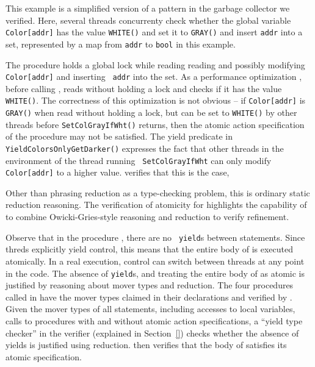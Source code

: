This example is a simplified version of a pattern in the garbage
collector we verified. Here, several threads concurrenty check 
whether the global variable {\tt Color[addr]} has the value {\tt WHITE()}
and set it to {\tt GRAY()} and insert {\tt addr} into a 
set, represented by a map from {\tt addr} to {\tt bool} in this
example. 

 
The procedure  
 holds a global lock while reading
reading and possibly modifying {\tt Color[addr]} and inserting {\tt
  addr} into the set. 
As a performance optimization , before calling
, reads  without holding a lock
and checks if it has the value {\tt WHITE()}. The correctness of this
optimization is not obvious -- if {\tt Color[addr]} is {\tt GRAY()} when
read without holding a lock, but can be set to {\tt WHITE()} by other 
threads before {\tt SetColGrayIfWht()} returns, then the atomic action
specification of the procedure may not be satisfied. The yield
predicate in {\tt YieldColorsOnlyGetDarker()} expresses the fact that
other threads in the environment of the thread running {\tt
  SetColGrayIfWht} can only modify {\tt Color[addr]} to a higher
value. \civl verifies that this is the case, 

Other than phrasing reduction as a type-checking problem, this is
ordinary static reduction reasoning. The verification of atomicity for
 highlights the capability of \civl to combine
Owicki-Gries-style reasoning and reduction to verify refinement.

Observe that in the procedure , there are no {\tt
  yield}s between statements. Since threds explicitly yield
control, this means that the entire body of 
is executed atomically. In a real execution, control can switch
between threads at any point in the code. The absence of {\tt yield}s,
and treating the entire body of  as atomic 
is justified by reasoning about mover types and reduction. The
four procedures called in  have the mover
types claimed in their declarations and verified by \civl. Given
the mover types of all statements, including accesses to local
variables, calls to procedures with and without atomic action
specifications, a ``yield type checker'' in the \civl verifier 
(explained in Section~\ref{}) checks whether the absence of yields is
justified using reduction.  \civl then verifies that the body of
 satisfies its atomic specification. 


